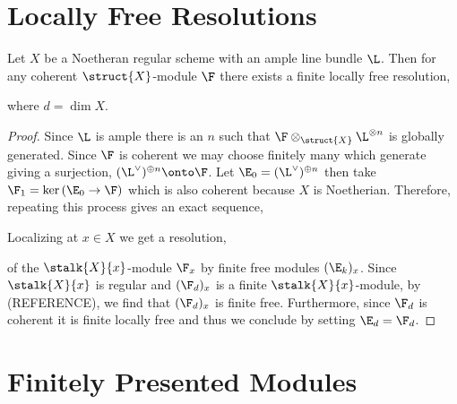 \documentclass[12pt]{article}
\begin{document}
\section{Locally Free Resolutions}

\begin{prop}
Let $X$ be a Noetheran regular scheme with an ample line bundle $\L$. Then for any coherent $\struct{X}$-module $\F$ there exists a finite locally free resolution,
\begin{center}
\end{center}
where $d = \dim{X}$.
\end{prop}

\begin{proof}
Since $\L$ is ample there is an $n$ such that $\F \otimes_{\struct{X}} \L^{\otimes n}$ is globally generated. Since $\F$ is coherent we may choose finitely many which generate giving a surjection, $(\L^\vee)^{\oplus n} \onto \F$. Let $\E_0 = (\L^\vee)^{\oplus n}$ then take $\F_1 = \ker{(\E_0 \to \F)}$ which is also coherent because $X$ is Noetherian. Therefore, repeating this process gives an exact sequence,
\begin{center}
\end{center}
Localizing at $x \in X$ we get a resolution,
\begin{center}
\end{center}
of the $\stalk{X}{x}$-module $\F_x$ by finite free modules $(\E_k)_x$. Since $\stalk{X}{x}$ is regular and $(\F_d)_x$ is a finite $\stalk{X}{x}$-module, by (REFERENCE), we find that $(\F_d)_x$ is finite free. Furthermore, since $\F_d$ is coherent it is finite locally free and thus we conclude by setting $\E_d = \F_d$.
\end{proof}

\section{Finitely Presented Modules}
\end{document}
